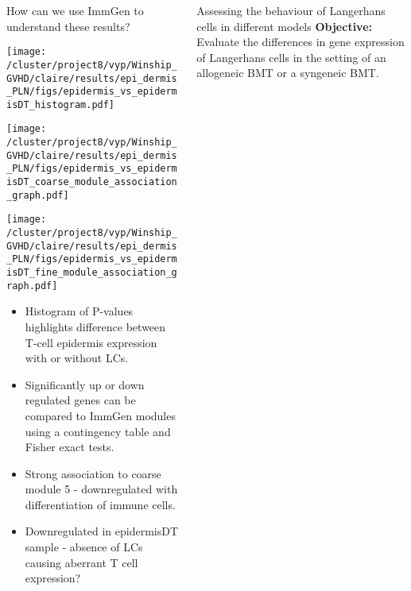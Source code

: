 \documentclass[final,hyperref={pdfpagelabels=false}]{beamer}
\begin{document}
\begin{frame}{}
\begin{columns}[t]
\begin{column}{.36\linewidth}
\begin{block}{How can we use ImmGen to understand these results?}  
\vspace{1cm}
\begin{minipage}{0.30\textwidth}
  \texttt{[image: /cluster/project8/vyp/Winship\_GVHD/claire/results/epi\_dermis\_PLN/figs/epidermis\_vs\_epidermisDT\_histogram.pdf]}
\end{minipage}
\hfill
\begin{minipage}{0.30\textwidth}
    \texttt{[image: /cluster/project8/vyp/Winship\_GVHD/claire/results/epi\_dermis\_PLN/figs/epidermis\_vs\_epidermisDT\_coarse\_module\_association\_graph.pdf]}
\end{minipage}
\hfill
\begin{minipage}{0.30\textwidth}
\texttt{[image: /cluster/project8/vyp/Winship\_GVHD/claire/results/epi\_dermis\_PLN/figs/epidermis\_vs\_epidermisDT\_fine\_module\_association\_graph.pdf]}
\end{minipage}
\hfill
\begin{itemize}
\item Histogram of P-values highlights difference between T-cell epidermis expression with or without LCs.
\item Significantly up or down regulated genes can be compared to ImmGen modules using a contingency table and Fisher exact tests.
\item Strong association to coarse module 5 - downregulated with differentiation of immune cells.
\item Downregulated in epidermisDT sample - absence of LCs causing aberrant T cell expression? 
\end{itemize}
\end{block}
\end{column}

\begin{column}{.36\linewidth}
  
  
  \begin{block}{Assessing the behaviour of Langerhans cells in different models}
    {\bf Objective:} Evaluate the differences in gene expression of Langerhans cells in the setting of an allogeneic BMT or a syngeneic BMT. 
    


\end{block}
\end{column}
\end{columns}
\end{frame}
\end{document}
